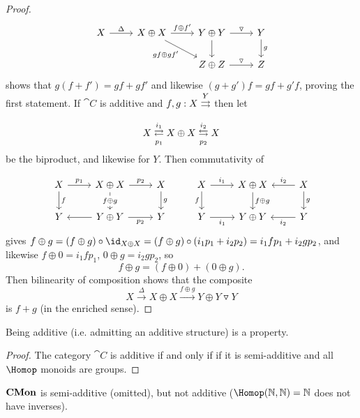 \documentclass[../main.tex]{subfiles}
\begin{document}
\begin{proof}
\[\begin{tikzcd}
	X & {X\oplus X} & {Y\oplus Y} & Y \\
	&& {Z\oplus Z} & Z
	\arrow["{gf\oplus gf'}"', from=1-2, to=2-3]
	\arrow[from=1-3, to=2-3]
	\arrow["\triangledown", from=1-3, to=1-4]
	\arrow["g", from=1-4, to=2-4]
	\arrow["\triangledown", from=2-3, to=2-4]
	\arrow["{f\oplus f'}", from=1-2, to=1-3]
	\arrow["\Delta", from=1-1, to=1-2]
\end{tikzcd}\]
shows that $g(f+ f') = gf + gf'$ and likewise $(g + g')f = gf + g'f$, proving the first statement.
	If $\cat C$ is additive and $f,g: X \xrightrightarrows Y$ then let
	\[
    	X \xrightleftarrows{i_1}[p_1] X \oplus X \xleftrightarrows{i_2}[p_2] X
    \] be the biproduct, and likewise for $Y$. Then commutativity of 
	
\[\begin{tikzcd}
	X & {X\oplus X} & X & X & {X\oplus X} & X \\
	Y & {Y\oplus Y} & Y & Y & {Y\oplus Y} & Y
	\arrow["f", from=1-1, to=2-1]
	\arrow["{p_1}", from=1-1, to=1-2]
	\arrow["{p_2}", from=1-2, to=1-3]
	\arrow["g", from=1-3, to=2-3]
	\arrow["{p_2}"', from=2-2, to=2-3]
	\arrow[from=2-2, to=2-1]
	\arrow["{f\oplus g}"{description}, from=1-2, to=2-2]
	\arrow["f"', from=1-4, to=2-4]
	\arrow["{i_1}"', from=2-4, to=2-5]
	\arrow["{i_1}", from=1-4, to=1-5]
	\arrow["{i_2}"', from=1-6, to=1-5]
	\arrow["{i_2}", from=2-6, to=2-5]
	\arrow["g", from=1-6, to=2-6]
	\arrow["{f\oplus g}", from=1-5, to=2-5]
\end{tikzcd}\]
gives $f \oplus g = (f \oplus g) \circ \id_{X \oplus X} = (f \oplus g) \circ (i_1 p_1 + i_2 p_2) = i_1 f p_1 + i_2 g p_2$, and likewise $f \oplus 0 = i_1 f p_1$, $0 \oplus g = i_2 g p_2$, so \[
    	f \oplus g = (f \oplus 0) + (0 \oplus g).
    \] Then bilinearity of composition shows that the composite
	\[
    	X \xrightarrow{\Delta} X \oplus X \xrightarrow{f \oplus g} Y \oplus Y \triangledown Y
    \] is $f + g$ (in the enriched sense).
\end{proof}
\begin{cor}
	Being additive (i.e. admitting an additive structure) is a property.
\end{cor}
\begin{proof}
	The category $\cat C$ is additive if and only if if it is semi-additive and all $\Hom$ monoids are groups.
\end{proof}

\begin{exmp}
	$\mathbf{CMon}$ is semi-additive (omitted), but not additive ($\Hom(\bb N, \bb N) = \bb N$ does not have inverses).
\end{exmp}
\end{document}
